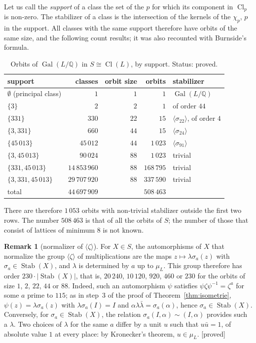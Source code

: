 \documentclass[11pt,a4paper]{amsart}
\theoremstyle{plain}
\theoremstyle{definition}
\newtheorem{remark}[theorem]{Remark}
\numberwithin{equation}{section}
\newcommand{\Q}{\mathbb{Q}}
\DeclareMathOperator{\Cl}{Cl}
\DeclareMathOperator{\Gal}{Gal}
\DeclareMathOperator{\Stab}{Stab}
\newcommand{\st}[1]{\textup{\textsf{\small[#1]}}}
\newcommand{\DEM}{\st{proved}}
\begin{document}
Let us call the \emph{support} of a class the set of the $p$ for which its component in $\Cl_p$ is non-zero. The stabilizer of a class is the intersection of the kernels of the $\chi_p$, $p$ in the support. All classes with the same support therefore have orbits of the same size, and the following count results; it was also recounted with Burnside's formula.

\begin{table}[ht]
\caption{Orbits of $\Gal(L/\Q)$ in $S\cong\Cl(L)$, by support. Status: proved.}\label{tab:orbites}
\centering\small
\begin{tabular}{lrrrl}
\toprule
support & classes & orbit size & orbits & stabilizer \\
\midrule
$\emptyset$ (principal class) & $1$ & $1$ & $1$ & $\Gal(L/\Q)$ \\
$\{3\}$ & $2$ & $2$ & $1$ & of order $44$ \\
$\{331\}$ & $330$ & $22$ & $15$ & $\langle\sigma_{22}\rangle$, of order $4$ \\
$\{3,331\}$ & $660$ & $44$ & $15$ & $\langle\sigma_{24}\rangle$ \\
$\{45\,013\}$ & $45\,012$ & $44$ & $1\,023$ & $\langle\sigma_{91}\rangle$ \\
$\{3,45\,013\}$ & $90\,024$ & $88$ & $1\,023$ & trivial \\
$\{331,45\,013\}$ & $14\,853\,960$ & $88$ & $168\,795$ & trivial \\
$\{3,331,45\,013\}$ & $29\,707\,920$ & $88$ & $337\,590$ & trivial \\
\midrule
total & $44\,697\,909$ & & $508\,463$ & \\
\bottomrule
\end{tabular}
\end{table}

There are therefore $1\,053$ orbits with non-trivial stabilizer outside the first two rows. The number $508\,463$ is that of all the orbits of $S$; the number of those that consist of lattices of minimum $8$ is not known.

\begin{remark}[normalizer of $\langle\zeta\rangle$]\label{rem:normalisateur}
For $X\in S$, the automorphisms of $X$ that normalize the group $\langle\zeta\rangle$ of multiplications are the maps $z\mapsto\lambda\sigma_a(z)$ with $\sigma_a\in\Stab(X)$, and $\lambda$ is determined by $a$ up to $\mu_L$. This group therefore has order $230\cdot|\Stab(X)|$, that is, $20\,240$, $10\,120$, $920$, $460$ or $230$ for the orbits of size $1$, $2$, $22$, $44$ or $88$. Indeed, such an automorphism $\psi$ satisfies $\psi\zeta\psi^{-1}=\zeta^a$ for some $a$ prime to $115$; as in step~3 of the proof of Theorem~\ref{thm:isometrie}, $\psi(z)=\lambda\sigma_a(z)$ with $\lambda\sigma_a(I)=I$ and $\alpha\lambda\bar\lambda=\sigma_a(\alpha)$, hence $\sigma_a\in\Stab(X)$. Conversely, for $\sigma_a\in\Stab(X)$, the relation $\sigma_a(I,\alpha)\sim(I,\alpha)$ provides such a $\lambda$. Two choices of $\lambda$ for the same $a$ differ by a unit $u$ such that $u\bar u=1$, of absolute value $1$ at every place: by Kronecker's theorem, $u\in\mu_L$. \DEM
\end{remark}
\end{document}
